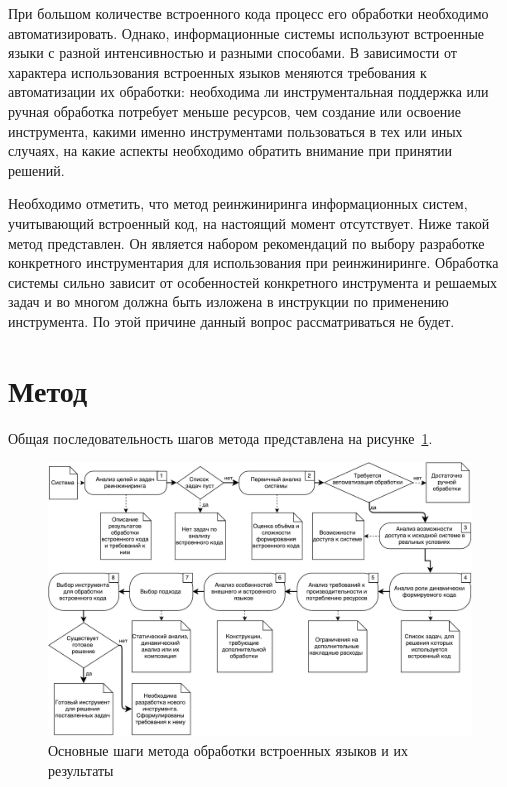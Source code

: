 При большом количестве встроенного кода процесс его обработки необходимо автоматизировать. Однако, информационные системы используют встроенные языки с разной интенсивностью и разными способами. В зависимости от характера использования встроенных языков меняются требования к автоматизации их обработки: необходима ли инструментальная поддержка или ручная обработка потребует меньше ресурсов, чем создание или освоение инструмента, какими именно инструментами пользоваться в тех или иных случаях, на какие аспекты необходимо обратить внимание при принятии решений.

Необходимо отметить, что метод реинжиниринга информационных систем, учитывающий встроенный код, на настоящий момент отсутствует. Ниже такой метод представлен. Он является набором рекомендаций по выбору разработке конкретного инструментария для использования при реинжиниринге. Обработка системы сильно зависит от особенностей конкретного инструмента и решаемых задач и во многом должна быть изложена в инструкции по применению инструмента. По этой причине данный вопрос рассматриваться не будет.


\section{Метод}

Общая последовательность шагов метода представлена на рисунке~\ref{fig:method}.

\begin{figure}[ht!]
\begin{center}
\includegraphics[width=.95\textwidth]{pics/ReengMethodSteps}
\caption{Основные шаги метода обработки встроенных языков и их результаты}
\label{fig:method} 
\end{center}
\end{figure}

